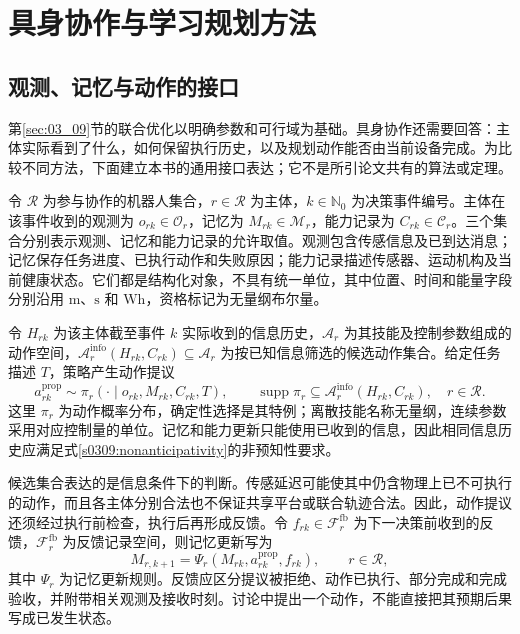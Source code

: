 \section{具身协作与学习规划方法}
\label{sec:03_10}

\subsection{观测、记忆与动作的接口}

第\ref{sec:03_09}节的联合优化以明确参数和可行域为基础。具身协作还需要回答：主体实际看到了什么，如何保留执行历史，以及规划动作能否由当前设备完成。为比较不同方法，下面建立本书的通用接口表达；它不是所引论文共有的算法或定理。

令 $\mathcal R$ 为参与协作的机器人集合，$r\in\mathcal R$ 为主体，$k\in\mathbb N_0$ 为决策事件编号。主体在该事件收到的观测为 $o_{rk}\in\mathcal O_r$，记忆为 $M_{rk}\in\mathcal M_r$，能力记录为 $C_{rk}\in\mathcal C_r$。三个集合分别表示观测、记忆和能力记录的允许取值。观测包含传感信息及已到达消息；记忆保存任务进度、已执行动作和失败原因；能力记录描述传感器、运动机构及当前健康状态。它们都是结构化对象，不具有统一单位，其中位置、时间和能量字段分别沿用 $\mathrm{m}$、$\mathrm{s}$ 和 $\mathrm{Wh}$，资格标记为无量纲布尔量。

令 $H_{rk}$ 为该主体截至事件 $k$ 实际收到的信息历史，$\mathcal A_r$ 为其技能及控制参数组成的动作空间，$\mathcal A_r^{\mathrm{info}}(H_{rk},C_{rk})\subseteq\mathcal A_r$ 为按已知信息筛选的候选动作集合。给定任务描述 $T$，策略产生动作提议
\begin{equation}
\label{s0310:policy_interface}
a_{rk}^{\mathrm{prop}}\sim
\pi_r(\cdot\mid o_{rk},M_{rk},C_{rk},T),
\qquad
\operatorname{supp}\pi_r\subseteq
\mathcal A_r^{\mathrm{info}}(H_{rk},C_{rk}),
\quad r\in\mathcal R.
\end{equation}
这里 $\pi_r$ 为动作概率分布，确定性选择是其特例；离散技能名称无量纲，连续参数采用对应控制量的单位。记忆和能力更新只能使用已收到的信息，因此相同信息历史应满足式\eqref{s0309:nonanticipativity}的非预知性要求。

候选集合表达的是信息条件下的判断。传感延迟可能使其中仍含物理上已不可执行的动作，而且各主体分别合法也不保证共享平台或联合轨迹合法。因此，动作提议还须经过执行前检查，执行后再形成反馈。令 $f_{rk}\in\mathcal F_r^{\mathrm{fb}}$ 为下一决策前收到的反馈，$\mathcal F_r^{\mathrm{fb}}$ 为反馈记录空间，则记忆更新写为
\begin{equation}
\label{s0310:memory_update}
M_{r,k+1}=\Psi_r(M_{rk},a_{rk}^{\mathrm{prop}},f_{rk}),
\qquad r\in\mathcal R,
\end{equation}
其中 $\Psi_r$ 为记忆更新规则。反馈应区分提议被拒绝、动作已执行、部分完成和完成验收，并附带相关观测及接收时刻。讨论中提出一个动作，不能直接把其预期后果写成已发生状态。


